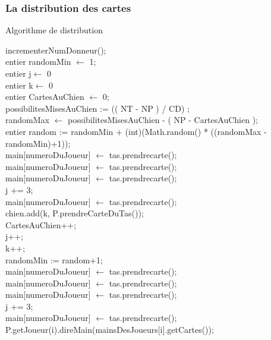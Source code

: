 \documentclass[a4paper]{report}
\begin{document}
			\subsubsection{La distribution des cartes}


				\begin{algorithm}[t!]
				\caption{Algorithme de distribution \label{algodistribution}}
					 \Begin
					{
						 incrementerNumDonneur();\\ 
						 entier randomMin $\leftarrow$ 1;\\
						 entier j$\leftarrow$ 0\\
						 entier k$\leftarrow$ 0 \\
						 entier CartesAuChien $\leftarrow$ 0;\\

						 
						 possibilitesMisesAuChien := (( NT - NP ) / CD) ;\\
						 {
							 randomMax $\leftarrow$ possibilitesMisesAuChien - ( NP - CartesAuChien );\\
							 

							 entier random := randomMin + (int)(Math.random() * ((randomMax - randomMin)+1));\\
							 {
								 main[numeroDuJoueur] $\leftarrow$ tas.prendrecarte();\\
								 main[numeroDuJoueur] $\leftarrow$ tas.prendrecarte();\\
								 main[numeroDuJoueur] $\leftarrow$ tas.prendrecarte();\\
								 j += 3;\\
								 
								 main[numeroDuJoueur] $\leftarrow$ tas.prendrecarte();\\
							 }
							chien.add(k, P.prendreCarteDuTas());\\
							CartesAuChien++;\\
							j++;\\
							k++;\\
							randomMin := random+1;\\
						}
						 {
							 main[numeroDuJoueur] $\leftarrow$ tas.prendrecarte();\\
							 main[numeroDuJoueur] $\leftarrow$ tas.prendrecarte();\\
							 main[numeroDuJoueur] $\leftarrow$ tas.prendrecarte();\\
							 j += 3;\\
							 main[numeroDuJoueur] $\leftarrow$ tas.prendrecarte();\\
						 }
						 {
							 P.getJoueur(i).direMain(mainsDesJoueurs[i].getCartes());\\
						 }
					}
				\end{algorithm}
\end{document}
